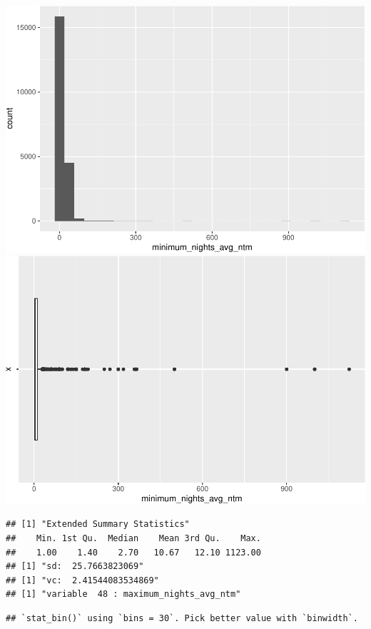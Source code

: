 \includegraphics{anal_files/figure-latex/unnamed-chunk-9-24.pdf}
\includegraphics{anal_files/figure-latex/unnamed-chunk-9-25.pdf}

\begin{verbatim}
## [1] "Extended Summary Statistics"
##    Min. 1st Qu.  Median    Mean 3rd Qu.    Max. 
##    1.00    1.40    2.70   10.67   12.10 1123.00 
## [1] "sd:  25.7663823069"
## [1] "vc:  2.41544083534869"
## [1] "variable  48 : maximum_nights_avg_ntm"
\end{verbatim}

\begin{verbatim}
## `stat_bin()` using `bins = 30`. Pick better value with `binwidth`.
\end{verbatim}

